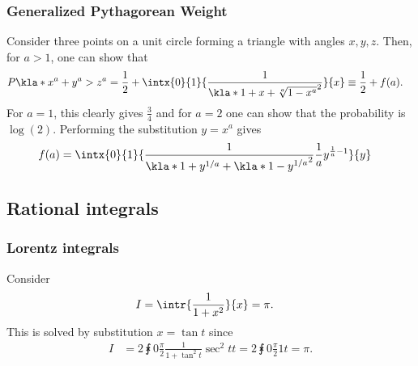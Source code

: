 \documentclass[english, parskip=full]{scrartcl}
\begin{document}
\subsubsection{Generalized Pythagorean Weight}
Consider three points on a unit circle forming a triangle with angles $x,y,z$.
Then, for $a>1$, one can show that %
\begin{align}
P\kla*{x^a+y^a > z^a} &= \frac{1}{2} + \intx{0}{1}{\frac{1}{\kla*{1+x+\sqrt[a]{1-x^a}}^2}}{x} \equiv \frac{1}{2} + f(a).
\end{align}
For $a=1$, this clearly gives $\frac{3}{4}$ and for $a=2$ one can show that the probability is $\log(2)$.
Performing the substitution $y=x^a$ gives
\begin{align}
f(a) &= \intx{0}{1}{\frac{1}{\kla*{1+y^{1/a} + \kla*{1-y}^{1/a}}^2}\frac{1}{a} y^{\frac{1}{a}-1} }{y}%
\end{align}
\subsection{Rational integrals}
\subsubsection{Lorentz integrals}
Consider
\begin{align}
I &= \intr{\frac{1}{1 + x^2}}{x}  = \pi. \label{eqn:1 over 1 plus x squared}
\end{align}
This is solved by substitution $x = \tan t$ since
\begin{align}
I &= 2\intx{0}{\frac{\pi}{2}}{ \frac{1}{1 + \tan^2t} \sec^2t}{t} = 2 \intx{0}{\frac{\pi}{2}}{1 }{t} = \pi.
\end{align}
\end{document}
